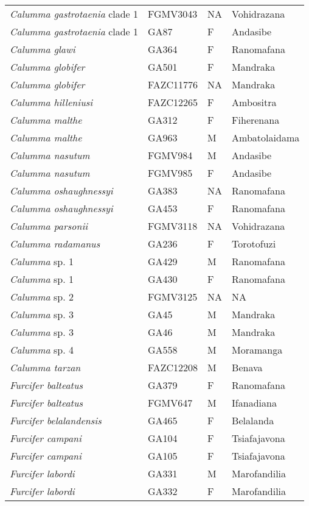 \begin{longtable}{llll}
\textit{Calumma gastrotaenia} clade 1 & FGMV3043 & NA & Vohidrazana\\
\textit{Calumma gastrotaenia} clade 1 & GA87 & F & Andasibe\\
\textit{Calumma glawi} & GA364 & F & Ranomafana\\
\textit{Calumma globifer} & GA501 & F & Mandraka\\
\textit{Calumma globifer} & FAZC11776 & NA & Mandraka\\
\textit{Calumma hilleniusi} & FAZC12265 & F & Ambositra\\
\textit{Calumma malthe} & GA312 & F & Fiherenana\\
\textit{Calumma malthe} & GA963 & M & Ambatolaidama\\
\textit{Calumma nasutum} & FGMV984 & M & Andasibe\\
\textit{Calumma nasutum} & FGMV985 & F & Andasibe\\
\textit{Calumma oshaughnessyi} & GA383 & NA & Ranomafana\\
\textit{Calumma oshaughnessyi} & GA453 & F & Ranomafana\\
\textit{Calumma parsonii} & FGMV3118 & NA & Vohidrazana\\
\textit{Calumma radamanus} & GA236 & F & Torotofuzi\\
\textit{Calumma} sp. 1 & GA429 & M & Ranomafana\\
\textit{Calumma} sp. 1 & GA430 & F & Ranomafana\\
\textit{Calumma} sp. 2 & FGMV3125 & NA & NA\\
\textit{Calumma} sp. 3 & GA45 & M & Mandraka\\
\textit{Calumma} sp. 3 & GA46 & M & Mandraka\\
\textit{Calumma} sp. 4 & GA558 & M & Moramanga\\
\textit{Calumma tarzan} & FAZC12208 & M & Benava\\
\hline
\textit{Furcifer balteatus} & GA379 & F & Ranomafana\\
\textit{Furcifer balteatus} & FGMV647 & M & Ifanadiana\\
\textit{Furcifer belalandensis} & GA465 & F & Belalanda\\
\textit{Furcifer campani} & GA104 & F & Tsiafajavona\\
\textit{Furcifer campani} & GA105 & F & Tsiafajavona\\
\textit{Furcifer labordi} & GA331 & M & Marofandilia\\
\textit{Furcifer labordi} & GA332 & F & Marofandilia\\

\end{longtable}
